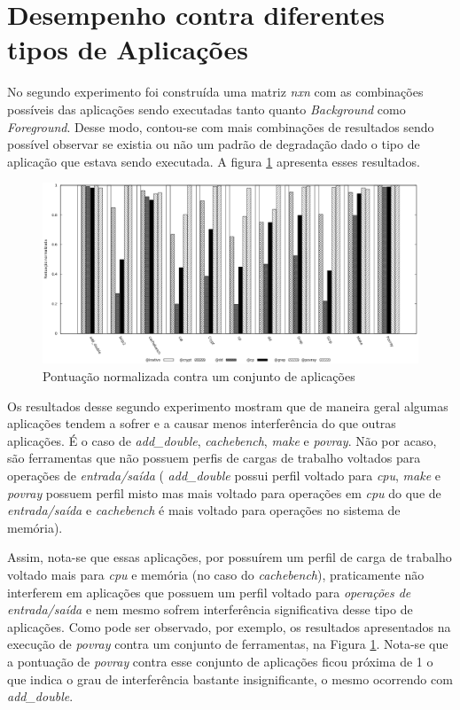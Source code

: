 \section{Desempenho contra diferentes tipos de Aplicações}
\label{sec:exp2}
No segundo experimento foi construída uma matriz \textit{nxn} com as combinações possíveis das aplicações sendo executadas tanto quanto \textit{Background } como \textit{Foreground}. Desse modo, contou-se com mais combinações de resultados sendo possível observar se existia ou não um padrão de degradação dado o tipo de aplicação que estava sendo executada. A figura \ref{second_experiment} apresenta esses resultados. %

\begin{figure}[!h]
\centering
\includegraphics [keepaspectratio=true,scale=0.45]{graficos/exp_2_foreground.eps}
\caption{Pontuação normalizada contra um conjunto de aplicações}
\label{second_experiment}
\end{figure} 

Os resultados desse segundo experimento mostram que de maneira geral algumas aplicações tendem a sofrer e a causar menos interferência do que outras aplicações. É o caso de \textit{add\_double}, \textit{cachebench}, \textit{make} e \textit{povray}. Não por acaso, são ferramentas que não possuem perfis de cargas de trabalho voltados para operações de \textit{entrada/saída} ( \textit{add\_double} possui perfil voltado para \textit{cpu}, \textit{make} e \textit{povray} possuem perfil misto mas mais voltado para operações em \textit{cpu} do que de \textit{entrada/saída} e \textit{cachebench} é mais voltado para operações no sistema de memória). 

Assim, nota-se que essas aplicações, por possuírem um perfil de carga de trabalho voltado mais para \textit{cpu} e memória (no caso do \textit{cachebench}), praticamente não interferem em aplicações que possuem um perfil voltado para \textit{operações de entrada/saída} e nem mesmo sofrem interferência significativa desse tipo de aplicações. Como pode ser observado, por exemplo, os resultados apresentados na execução de \textit{povray} contra um conjunto de ferramentas, na Figura \ref{second_experiment}. Nota-se que a pontuação de \textit{povray} contra esse conjunto de aplicações ficou próxima de 1 o que indica o grau de interferência bastante insignificante, o mesmo ocorrendo com \textit{add\_double}.

